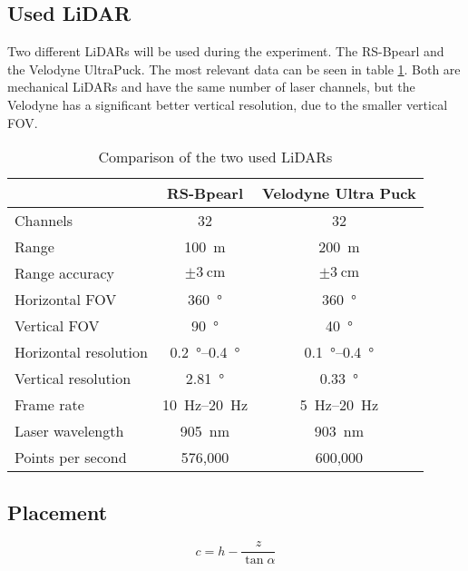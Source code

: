 \subsection{Used LiDAR}
Two different LiDARs will be used during the experiment.
The RS-Bpearl and the Velodyne UltraPuck.
The most relevant data can be seen in table \ref{tab:lidar_datasheets}.
Both are mechanical LiDARs and have the same number of laser channels, but the Velodyne has a significant better vertical resolution, due to the smaller vertical FOV.

\begin{table}[ht]
	\centering
	\caption{Comparison of the two used LiDARs \cite{RoboSense2020}\cite{Rev}}
	\label{tab:lidar_datasheets}
	\begin{tabular}[t]{lcc}
	\toprule
	&RS-Bpearl & Velodyne Ultra Puck\\
	\midrule
	Channels 				& 32 							& 32\\
	Range 					& \SI{100}{\metre}				& \SI{200}{\metre}\\
	Range accuracy			& $\pm\SI{3}{\centi\metre}$		& $\pm\SI{3}{\centi\metre}$\\
	Horizontal FOV		 	& \SI{360}{\degree}				& \SI{360}{\degree}\\
	Vertical FOV 			& \SI{90}{\degree}				& \SI{40}{\degree}\\
	Horizontal resolution	& \SIrange{0.2}{0.4}{\degree} 	& \SIrange{0.1}{0.4}{\degree}\\
	Vertical resolution		& \SI{2.81}{\degree} 			& \SI{0.33}{\degree}\\
	Frame rate 				& \SIrange{10}{20}{\hertz}		& \SIrange{5}{20}{\hertz}\\
	Laser wavelength 		& \SI{905}{\nano\metre} 		& \SI{903}{\nano\metre}\\
	Points per second 		& 576,000						& 600,000		\\
	\bottomrule
	\end{tabular}
	\end{table}%


\subsection{Placement}
\[ c = h - \frac{z}{\tan \alpha} \]

